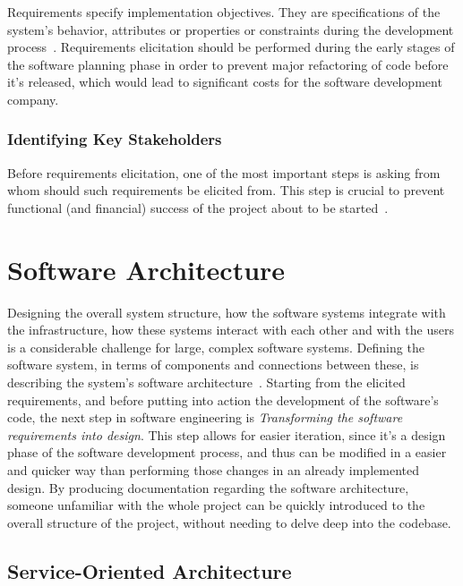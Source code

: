 Requirements specify implementation objectives. They are specifications of the system's behavior, attributes or properties or constraints during the development process~\Parencite{sommerville_sawyer_1997}. Requirements elicitation should be performed during the early stages of the software planning phase in order to prevent major refactoring of code before it's released, which would lead to significant costs for the software development company.

\subsubsection{Identifying Key Stakeholders}\label{state-of-the-art:sss:identifying-key-stakeholders}

Before requirements elicitation, one of the most important steps is asking from whom should such requirements be elicited from. This step is crucial to prevent functional (and financial) success of the project about to be started~\Parencite{lewellen_2020}.


\section{Software Architecture}\label{state-of-the-art:s:software-architecture}

Designing the overall system structure, how the software systems integrate with the infrastructure, how these systems interact with each other and with the users is a considerable challenge for large, complex software systems. Defining the software system, in terms of components and connections between these, is describing the system's software architecture~\Parencite{hasselbring2018software}. Starting from the elicited requirements, and before putting into action the development of the software's code, the next step in software engineering is \textit{Transforming the software requirements into design}. This step allows for easier iteration, since it's a design phase of the software development process, and thus can be modified in a easier and quicker way than performing those changes in an already implemented design.
By producing documentation regarding the software architecture, someone unfamiliar with the whole project can be quickly introduced to the overall structure of the project, without needing to delve deep into the codebase.

\subsection{Service-Oriented Architecture}\label{state-of-the-art:ss:service-oriented-architecture}

